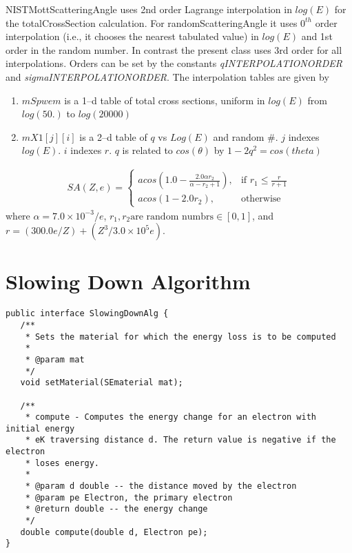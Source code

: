 NISTMottScatteringAngle uses 2nd order Lagrange interpolation in $log(E)$ for the totalCrossSection calculation. For randomScatteringAngle it uses $0^{th}$ order interpolation (i.e., it chooses the nearest tabulated value) in $log(E)$ and 1st order in the random number. In contrast the present class uses 3rd order for all interpolations. Orders can be set by the constants \textit{qINTERPOLATIONORDER} and \textit{sigmaINTERPOLATIONORDER}. The interpolation tables are given by
\begin{enumerate}
\item $mSpwem$ is a 1--d table of total cross sections, uniform in $log(E)$ from $log(50.)$ to $log(20000)$
\item $mX1[j][i]$ is a 2--d table of $q$ vs $Log(E)$ and random \#. $j$ indexes $log(E)$. $i$ indexes $r$. $q$ is related to $cos(\theta)$ by $1-2q^2=cos(theta)$
\end{enumerate}


\begin{align*}
    SA(Z, e)= 
\begin{cases}
    acos\left (1.0 - \frac{2.0 \alpha r_2}{\alpha - r_2 + 1}\right ), & \text{if } r_1 \leq \frac{r}{r+1}\\
    acos(1-2.0r_2), & \text{otherwise}
\end{cases}
\end{align*}
where $\alpha = 7.0\times 10^{-3}/e$, $r_1, r_2 \text{are random numbrs} \in [0, 1]$, and $r = (300.0 e / Z) + (Z^3 / 3.0\times 10^5 e)$.

\section{Slowing Down Algorithm}\label{impl:sda}
\begin{lstlisting}
public interface SlowingDownAlg {
   /**
    * Sets the material for which the energy loss is to be computed
    *
    * @param mat
    */
   void setMaterial(SEmaterial mat);

   /**
    * compute - Computes the energy change for an electron with initial energy
    * eK traversing distance d. The return value is negative if the electron
    * loses energy.
    *
    * @param d double -- the distance moved by the electron
    * @param pe Electron, the primary electron
    * @return double -- the energy change
    */
   double compute(double d, Electron pe);
}
\end{lstlisting}
